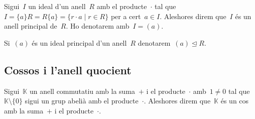 \documentclass[../../main.tex]{subfiles}
\begin{document}
    \begin{definition}
        \label{def:ideal principal}
        Sigui~\(I\) un ideal d'un anell~\(R\) amb el producte~\(\cdot\) tal que~\(I=\{a\}R=R\{a\}=\{r\cdot a\mid r\in R\}\) per a cert~\(a\in I\).
        Aleshores direm que~\(I\) és un anell principal de~\(R\).
        Ho denotarem amb~\(I=(a)\).
    \end{definition}
    \begin{notation}
        Si~\((a)\) és un ideal principal d'un anell~\(R\) denotarem~\((a)\trianglelefteq R\).
    \end{notation}
    \subsection{Cossos i l'anell quocient}
    \begin{definition}[Cos] %
        \label{def:cos per anells}
        Sigui~\(\mathbb{K}\) un anell commutatiu amb la suma~\(+\) i el producte~\(\cdot\) amb~\(1\neq0\) tal que~\(\mathbb{K}\setminus\{0\}\) sigui un grup abelià amb el producte~\(\cdot\).
        Aleshores direm que~\(\mathbb{K}\) és un cos amb la suma~\(+\) i el producte~\(\cdot\).
    \end{definition}
\end{document}
